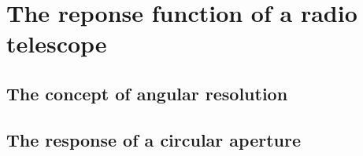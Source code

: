 \chapter{The reponse function of a radio telescope}

\section{The concept of angular resolution}

\section{The response of a circular aperture}


